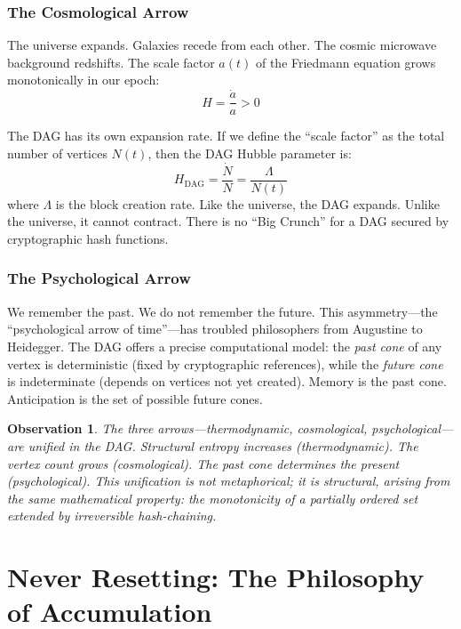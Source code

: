 \documentclass[12pt,a4paper]{article}
\theoremstyle{philosophical}
\newtheorem{observation}{Observation}
\begin{document}
\subsubsection{The Cosmological Arrow}

The universe expands. Galaxies recede from each other. The cosmic microwave background redshifts. The scale factor $a(t)$ of the Friedmann equation grows monotonically in our epoch:
\begin{equation}
H = \frac{\dot{a}}{a} > 0
\end{equation}

The DAG has its own expansion rate. If we define the ``scale factor'' as the total number of vertices $N(t)$, then the DAG Hubble parameter is:
\begin{equation}
H_{\mathrm{DAG}} = \frac{\dot{N}}{N} = \frac{\Lambda}{N(t)}
\end{equation}
where $\Lambda$ is the block creation rate. Like the universe, the DAG expands. Unlike the universe, it cannot contract. There is no ``Big Crunch'' for a DAG secured by cryptographic hash functions.

\subsubsection{The Psychological Arrow}

We remember the past. We do not remember the future. This asymmetry---the ``psychological arrow of time''---has troubled philosophers from Augustine to Heidegger. The DAG offers a precise computational model: the \emph{past cone} of any vertex is deterministic (fixed by cryptographic references), while the \emph{future cone} is indeterminate (depends on vertices not yet created). Memory is the past cone. Anticipation is the set of possible future cones.

\begin{observation}
The three arrows---thermodynamic, cosmological, psychological---are unified in the DAG. Structural entropy increases (thermodynamic). The vertex count grows (cosmological). The past cone determines the present (psychological). This unification is not metaphorical; it is structural, arising from the same mathematical property: the monotonicity of a partially ordered set extended by irreversible hash-chaining.
\end{observation}

\section{Never Resetting: The Philosophy of Accumulation}
\end{document}
